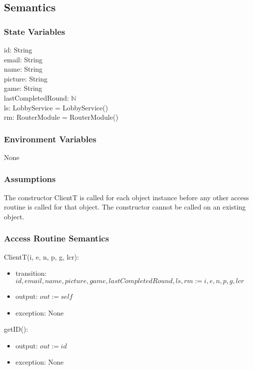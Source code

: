 \documentclass[12pt, titlepage]{article}
\begin{document}
\subsection{Semantics}

\subsubsection{State Variables}

id: String\\
email: String\\
name: String\\
picture: String\\
game: String\\
lastCompletedRound: $\mathbb{N}$\\
ls: LobbyService = LobbyService() \\
rm: RouterModule = RouterModule() 


\subsubsection{Environment Variables}
None

\subsubsection{Assumptions}
The constructor ClientT is called for each object instance before any other access routine is called for that object. The constructor cannot be called on an existing object.

\subsubsection{Access Routine Semantics}

\noindent ClientT(i, e, n, p, g, lcr):
\begin{itemize}
\item transition: $id, email, name, picture, game, lastCompletedRound, ls, rm := i, e, n, p, g, lcr$
\item output: $out := self$
\item exception: None
\end{itemize}

\noindent getID():
\begin{itemize}
\item output: $out := id$
\item exception: None
\end{itemize}
\end{document}
